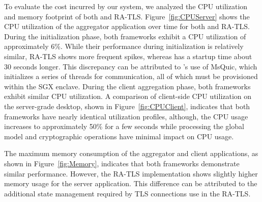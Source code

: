 To evaluate the cost incurred by our system, we analyzed the CPU utilization and memory footprint of both \sysname and RA-TLS.
Figure~\ref{fig:CPUServer} shows the CPU utilization of the aggregator application over time for both \sysname and RA-TLS. During the initialization phase, both frameworks exhibit a CPU utilization of approximately 6\%. While their performance during initialization is relatively similar, RA-TLS shows more frequent spikes, whereas \sysname has a startup time about 30 seconds longer. This discrepancy can be attributed to \sysname's use of MsQuic, which initializes a series of threads for communication, all of which must be provisioned within the SGX enclave. During the client aggregation phase, both frameworks exhibit similar CPU utilization.
A comparison of client-side CPU utilization on the server-grade desktop, shown in Figure~\ref{fig:CPUClient}, indicates that both frameworks have nearly identical utilization profiles, although, the CPU usage increases to approximately 50\% for a few seconds while processing the global model and cryptographic operations have minimal impact on CPU usage.

The maximum memory consumption of the aggregator and client applications, as shown in Figure~\ref{fig:Memory}, indicates that both frameworks demonstrate similar performance. However, the RA-TLS implementation shows slightly higher memory usage for the server application. This difference can be attributed to the additional state management required by TLS connections use in the RA-TLS.


